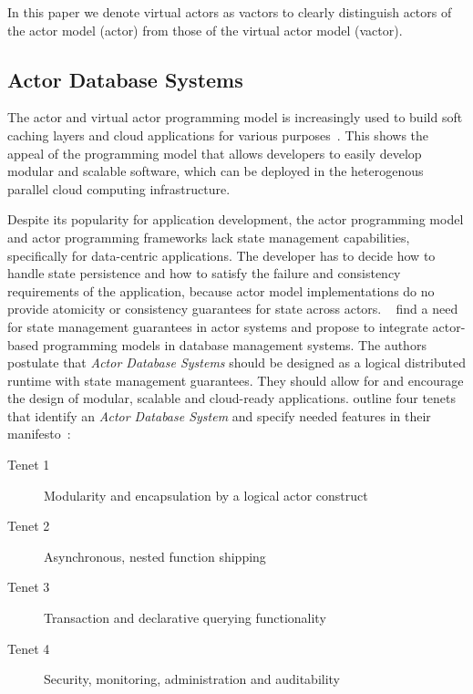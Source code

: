   In this paper we denote virtual actors as vactors to clearly distinguish actors of the actor model (actor) from those of the virtual actor model (vactor).



  \subsection{Actor Database Systems}
  The actor and virtual actor programming model is increasingly used to build soft caching layers and cloud applications for various purposes~\cite{erlang_uses,akka_uses,orleans_uses}.
  This shows the appeal of the programming model that allows developers to easily develop modular and scalable software, which can be deployed in the heterogenous parallel cloud computing infrastructure.
  
  Despite its popularity for application development, the actor programming model and actor programming frameworks lack state management capabilities, specifically for data-centric applications.
  The developer has to decide how to handle state persistence and how to satisfy the failure and consistency requirements of the application, because actor model implementations do no provide atomicity or consistency guarantees for state across actors.
  \citeauthor{manifesto}~\cite{manifesto} find a need for state management guarantees in actor systems and propose to integrate actor-based programming models in database management systems.
  The authors postulate that \textit{Actor Database Systems} should be designed as a logical distributed runtime with state management guarantees.
  They should allow for and encourage the design of modular, scalable and cloud-ready applications.
  \citeauthor{manifesto} outline four tenets that identify an \textit{Actor Database System} and specify needed features in their manifesto~\cite{manifesto}:
  \begin{description}
    \item[Tenet 1] Modularity and encapsulation by a logical actor construct
    \item[Tenet 2] Asynchronous, nested function shipping
    \item[Tenet 3] Transaction and declarative querying functionality
    \item[Tenet 4] Security, monitoring, administration and auditability
  \end{description}

